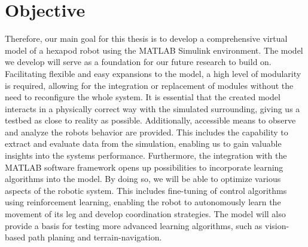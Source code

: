 


\section{Objective}
Therefore, our main goal for this thesis is to develop a comprehensive virtual model of a hexapod robot using the MATLAB Simulink\textsuperscript{\textregistered} environment.
The model we develop will serve as a foundation for our future research to build on.
Facilitating flexible and easy expansions to the model, a high level of modularity is required, allowing for the integration or replacement of modules without the need to reconfigure the whole system.
It is essential that the created model interacts in a physically correct way with the simulated surrounding, giving us a testbed as close to reality as possible.
Additionally, accessible means to observe and analyze the robots behavior are provided.
This includes the capability to extract and evaluate data from the simulation, enabling us to gain valuable insights into the systems performance.
Furthermore, the integration with the MATLAB software framework opens up possibilities to incorporate learning algorithms into the model.
By doing so, we will be able to optimize various aspects of the robotic system. 
This includes fine-tuning of control algorithms using reinforcement learning, enabling the robot to autonomously learn the movement of its leg and develop coordination strategies.
The model will also provide a basis for testing more advanced learning algorithms, such as vision-based path planing and terrain-navigation.

